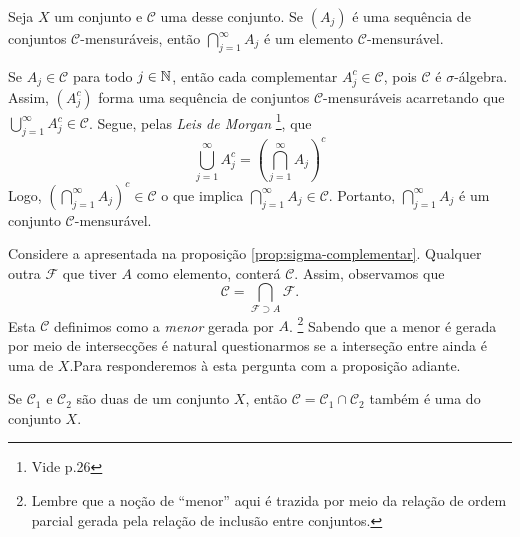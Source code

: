\begin{proposition}
\label{prop:interseção-elementos-sigmas}
    Seja $X$ um conjunto e $\mathcal{C}$ uma \sigal desse conjunto.
    Se $(A_j)$ é uma sequência  de conjuntos $\mathcal{C} $-mensuráveis, então $\displaystyle \bigcap_{j = 1}^\infty A_j$ é um elemento $\mathcal{C}$-mensurável.
\end{proposition}
\begin{prova}
    Se $A_j \in \mathcal{C}$ para todo $j \in \operatorname{\mathbb{N}}$, então cada complementar $A_j^c \in \mathcal{C}$, pois $\mathcal{C}$ é $\sigma$-álgebra. 
    Assim, $(A_j^c)$ forma uma sequência de conjuntos $\mathcal{C}$-mensuráveis acarretando que 
    $\displaystyle \bigcup_{j = 1}^\infty A_j^c \in \mathcal{C}$. 
    Segue, pelas \textit{Leis de Morgan}
    \footnote{Vide \supercite{elon}{p.26}}, que 
    $$
    \displaystyle \bigcup_{j = 1}^\infty A_j^c 
    = \left(\displaystyle \bigcap_{j = 1}^\infty A_j\right)^c
  	$$
	Logo, $\left(\displaystyle \bigcap_{j = 1}^\infty A_j\right)^c \in \mathcal{C}$ o que implica $\displaystyle \bigcap_{j = 1}^\infty A_j \in \mathcal{C}$. 
	Portanto, $\displaystyle \bigcap_{j = 1}^\infty A_j$ é um conjunto $\mathcal{C}$-mensurável.
\end{prova}

Considere a \sigal apresentada na proposição \ref{prop:sigma-complementar}. 
Qualquer outra \sigal $\mathcal{F}$ que tiver $A$ como elemento, conterá $\mathcal{C}$.
Assim, observamos que 
$$
\mathcal{C} = \displaystyle \bigcap_{\mathcal{F} \supset A} \mathcal{F}.
$$
Esta \sigal $\mathcal{C}$   definimos como a \textit{menor} \sigal gerada por $A$. 
%
\footnote{Lembre que a noção de \enquote{menor} aqui é trazida por meio da relação de ordem parcial gerada pela relação de inclusão entre conjuntos.}
%
Sabendo que a menor \sigal é gerada por meio de intersecções é natural questionarmos se a interseção entre \sigals ainda é uma \sigal de $X$.Para responderemos à esta pergunta com a proposição adiante.

\begin{proposition}
\label{prop:interseção-2sigmas}
    Se $\mathcal{C}_1$ e $\mathcal{C}_2$ são duas \sigals de um conjunto $X$, então $\mathcal{C} = \mathcal{C}_1 \cap \mathcal{C}_2$ também é uma \sigal do conjunto $X$.
\end{proposition}

